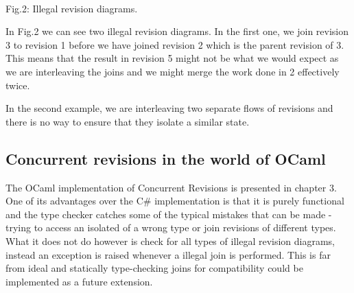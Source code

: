 \documentclass[12pt,twoside,notitlepage]{report}
\begin{document}
\\Fig.2: Illegal revision diagrams.
\vspace{10pt}

In Fig.2 we can see two illegal revision diagrams. In the first one, we join revision 3 to revision 1 before we have joined revision 2 which is the parent revision of 3. This means that the result in revision 5 might not be what we would expect as we are interleaving the joins and we might merge the work done in 2 effectively twice.

In the second example, we are interleaving two separate flows of revisions and there is no way to ensure that they isolate a similar state.

\subsection{Concurrent revisions in the world of OCaml}
The OCaml implementation of Concurrent Revisions is presented in chapter 3. One of its advantages over the C\# implementation is that it is purely functional and the type checker catches some of the typical mistakes that can be made - trying to access an isolated of a wrong type or join revisions of different types. What it does not do however is check for all types of illegal revision diagrams, instead an exception is raised whenever a illegal join is performed. This is far from ideal and statically type-checking joins for compatibility could be implemented as a future extension.
\end{document}
